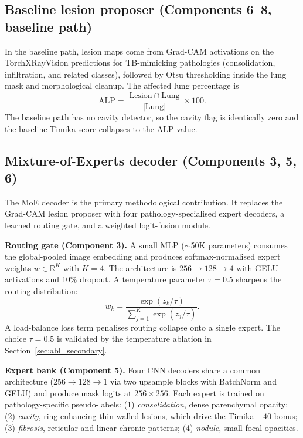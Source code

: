 \documentclass{article}
\begin{document}
\subsection{Baseline lesion proposer (Components 6--8, baseline path)}

In the baseline path, lesion maps come from Grad-CAM \cite{selvaraju2017gradcam} activations on the TorchXRayVision predictions for TB-mimicking pathologies (consolidation, infiltration, and related classes), followed by Otsu thresholding \cite{otsu1979threshold} inside the lung mask and morphological cleanup. The affected lung percentage is
\begin{equation}
\text{ALP} = \frac{|\text{Lesion} \cap \text{Lung}|}{|\text{Lung}|} \times 100.
\label{eq:alp}
\end{equation}
The baseline path has no cavity detector, so the cavity flag is identically zero and the baseline Timika score collapses to the ALP value.

\subsection{Mixture-of-Experts decoder (Components 3, 5, 6)}
\label{sec:moe}

The MoE decoder is the primary methodological contribution. It replaces the Grad-CAM lesion proposer with four pathology-specialised expert decoders, a learned routing gate, and a weighted logit-fusion module.

\textbf{Routing gate (Component 3).} A small MLP ($\sim$50K parameters) consumes the global-pooled image embedding and produces softmax-normalised expert weights $w \in \mathbb{R}^K$ with $K=4$. The architecture is $256 \to 128 \to 4$ with GELU activations and 10\% dropout. A temperature parameter $\tau = 0.5$ sharpens the routing distribution:
\begin{equation}
w_k = \frac{\exp(z_k / \tau)}{\sum_{j=1}^{K} \exp(z_j / \tau)}.
\label{eq:routing}
\end{equation}
A load-balance loss term penalises routing collapse onto a single expert. The choice $\tau = 0.5$ is validated by the temperature ablation in Section~\ref{sec:abl_secondary}.

\textbf{Expert bank (Component 5).} Four CNN decoders share a common architecture ($256 \to 128 \to 1$ via two upsample blocks with BatchNorm and GELU) and produce mask logits at $256{\times}256$. Each expert is trained on pathology-specific pseudo-labels: (1) \emph{consolidation}, dense parenchymal opacity; (2) \emph{cavity}, ring-enhancing thin-walled lesions, which drive the Timika $+40$ bonus; (3) \emph{fibrosis}, reticular and linear chronic patterns; (4) \emph{nodule}, small focal opacities.
\end{document}
